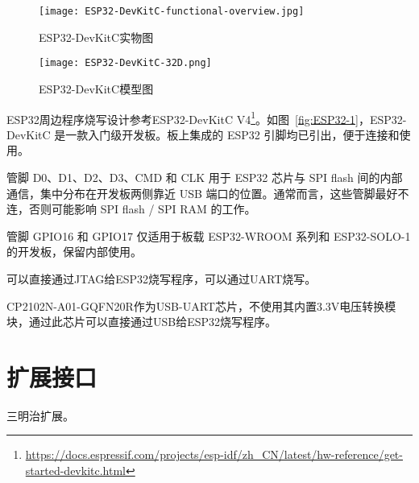 \begin{figure}
    \begin{minipage}{0.48\textwidth}
      \centering
      \texttt{[image: ESP32-DevKitC-functional-overview.jpg]}
      \caption{ESP32-DevKitC实物图}
      \label{fig:ESP32-1}
    \end{minipage}\hfill
    \begin{minipage}{0.48\textwidth}
      \centering
      \texttt{[image: ESP32-DevKitC-32D.png]}
      \caption{ESP32-DevKitC模型图}
      \label{fig:ESP32-2}
    \end{minipage}
\end{figure}

ESP32周边程序烧写设计参考ESP32-DevKitC V4\footnote{\url{https://docs.espressif.com/projects/esp-idf/zh_CN/latest/hw-reference/get-started-devkitc.html}}。如图~\ref{fig:ESP32-1}，ESP32-DevKitC 是一款入门级开发板。板上集成的 ESP32 引脚均已引出，便于连接和使用。

管脚 D0、D1、D2、D3、CMD 和 CLK 用于 ESP32 芯片与 SPI flash 间的内部通信，集中分布在开发板两侧靠近 USB 端口的位置。通常而言，这些管脚最好不连，否则可能影响 SPI flash / SPI RAM 的工作。

管脚 GPIO16 和 GPIO17 仅适用于板载 ESP32-WROOM 系列和 ESP32-SOLO-1 的开发板，保留内部使用。

可以直接通过JTAG给ESP32烧写程序，可以通过UART烧写。

CP2102N-A01-GQFN20R作为USB-UART芯片，不使用其内置3.3V电压转换模块，通过此芯片可以直接通过USB给ESP32烧写程序。

\section{扩展接口}

三明治扩展。

